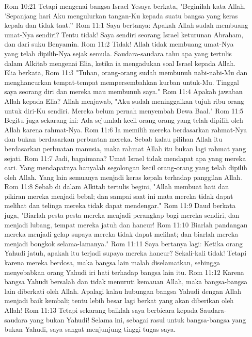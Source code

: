 Rom 10:21  Tetapi mengenai bangsa Israel Yesaya berkata, "Beginilah kata Allah, 'Sepanjang hari Aku mengulurkan tangan-Ku kepada suatu bangsa yang keras kepala dan tidak taat.'"
Rom 11:1  Saya bertanya: Apakah Allah sudah membuang umat-Nya sendiri? Tentu tidak! Saya sendiri seorang Israel keturunan Abraham, dan dari suku Benyamin.
Rom 11:2  Tidak! Allah tidak membuang umat-Nya yang telah dipilih-Nya sejak semula. Saudara-saudara tahu apa yang tertulis dalam Alkitab mengenai Elia, ketika ia mengadukan soal Israel kepada Allah. Elia berkata,
Rom 11:3  "Tuhan, orang-orang sudah membunuh nabi-nabi-Mu dan menghancurkan tempat-tempat mempersembahkan kurban untuk-Mu. Tinggal saya seorang diri dan mereka mau membunuh saya."
Rom 11:4  Apakah jawaban Allah kepada Elia? Allah menjawab, "Aku sudah meninggalkan tujuh ribu orang untuk diri-Ku sendiri. Mereka belum pernah menyembah Dewa Baal."
Rom 11:5  Begitu juga sekarang ini: Ada sejumlah kecil orang-orang yang telah dipilih oleh Allah karena rahmat-Nya.
Rom 11:6  Ia memilih mereka berdasarkan rahmat-Nya dan bukan berdasarkan perbuatan mereka. Sebab kalau pilihan Allah itu berdasarkan perbuatan manusia, maka rahmat Allah itu bukan lagi rahmat yang sejati.
Rom 11:7  Jadi, bagaimana? Umat Israel tidak mendapat apa yang mereka cari. Yang mendapatnya hanyalah segolongan kecil orang-orang yang telah dipilih oleh Allah. Yang lain semuanya menjadi keras kepala terhadap panggilan Allah.
Rom 11:8  Sebab di dalam Alkitab tertulis begini, "Allah membuat hati dan pikiran mereka menjadi bebal; dan sampai saat ini mata mereka tidak dapat melihat dan telinga mereka tidak dapat mendengar."
Rom 11:9  Daud berkata juga, "Biarlah pesta-pesta mereka menjadi perangkap bagi mereka sendiri, dan menjadi lubang, tempat mereka jatuh dan hancur!
Rom 11:10  Biarlah pandangan mereka menjadi gelap supaya mereka tidak dapat melihat; dan biarlah mereka menjadi bongkok selama-lamanya."
Rom 11:11  Saya bertanya lagi: Ketika orang Yahudi jatuh, apakah itu terjadi supaya mereka hancur? Sekali-kali tidak! Tetapi karena mereka berdosa, maka bangsa lain malah diselamatkan, sehingga menyebabkan orang Yahudi iri hati terhadap bangsa lain itu.
Rom 11:12  Karena bangsa Yahudi bersalah dan tidak menuruti kemauan Allah, maka bangsa-bangsa lain diberkati oleh Allah. Apalagi kalau hubungan bangsa Yahudi dengan Allah menjadi baik kembali; tentu lebih besar lagi berkat yang akan diberikan oleh Allah!
Rom 11:13  Tetapi sekarang baiklah saya berbicara kepada Saudara-saudara yang bukan Yahudi! Selama ini, sebagai rasul untuk bangsa-bangsa yang bukan Yahudi, saya sangat menjunjung tinggi tugas saya.
